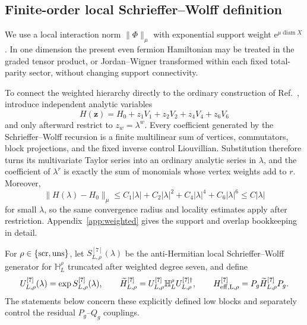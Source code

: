 \documentclass[11pt]{article}
\theoremstyle{definition}
\theoremstyle{remark}
\newcommand{\e}{\mathrm e}
\newcommand{\norm}[1]{\lVert #1\rVert}
\begin{document}
\subsection{Finite-order local Schrieffer--Wolff definition}

We use a local interaction norm $\norm{\Phi}_\mu$ with exponential support weight $\e^{\mu\operatorname{diam}X}$.  In one dimension the present even fermion Hamiltonian may be treated in the graded tensor product, or Jordan--Wigner transformed within each fixed total-parity sector, without changing support connectivity.

To connect the weighted hierarchy directly to the ordinary construction of Ref.~\cite{Bravyi2011}, introduce independent analytic variables
\begin{equation}
 H(\mathbf z)=H_0+z_1V_1+z_2V_2+z_4V_4+z_6V_6
\end{equation}
and only afterward restrict to $z_w=\lambda^w$.  Every coefficient generated by the Schrieffer--Wolff recursion is a finite multilinear sum of vertices, commutators, block projections, and the fixed inverse control Liouvillian.  Substitution therefore turns its multivariate Taylor series into an ordinary analytic series in $\lambda$, and the coefficient of $\lambda^r$ is exactly the sum of monomials whose vertex weights add to $r$.  Moreover,
\begin{equation}
 \norm{H(\lambda)-H_0}_\mu
 \le C_1|\lambda|+C_2|\lambda|^2+C_4|\lambda|^4+C_6|\lambda|^6
 \le C|\lambda|
\end{equation}
for small $\lambda$, so the same convergence radius and locality estimates apply after restriction.  Appendix~\ref{app:weighted} gives the support and overlap bookkeeping in detail.

For $\rho\in\{{\rm scr},{\rm uns}\}$, let $S_{L,\rho}^{[7]}(\lambda)$ be the anti-Hermitian local Schrieffer--Wolff generator for $\mathbb H_L^\rho$ truncated after weighted degree seven, and define
\begin{equation}
 U_{L,\rho}^{[7]}(\lambda)=\exp S_{L,\rho}^{[7]}(\lambda),
 \qquad
 \widetilde H_{L,\rho}^{[7]}=U_{L,\rho}^{[7]}\mathbb H_L^\rho U_{L,\rho}^{[7]\dagger},
 \qquad
 H_{\rm eff,L,\rho}^{[7]}=P_g\widetilde H_{L,\rho}^{[7]}P_g.
 \label{eq:Heff-definition}
\end{equation}
The statements below concern these explicitly defined low blocks and separately control the residual $P_g$--$Q_g$ couplings.
\end{document}
